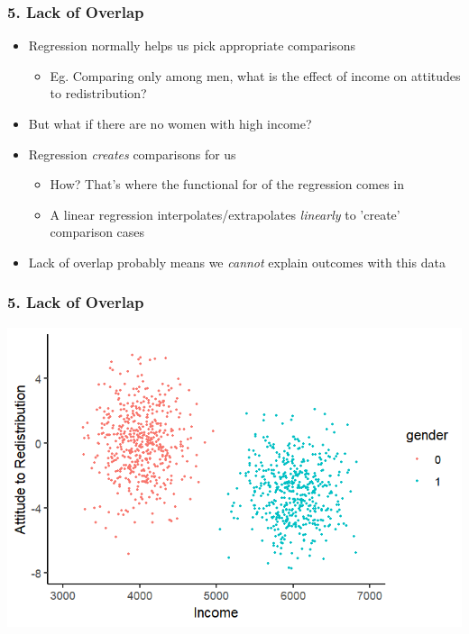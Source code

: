 \documentclass[xcolor=x11names,compress]{beamer}\usepackage[]{graphicx}\usepackage[]{color}
\makeatletter
\def\maxwidth{ %
  \ifdim\Gin@nat@width>\linewidth
    \linewidth
  \else
    \Gin@nat@width
  \fi
}
\newenvironment{knitrout}{}{} %
\renewcommand{\(}{\begin{columns}}
\renewcommand{\)}{\end{columns}}
\newcommand{\<}[1]{\begin{column}{#1}}
\renewcommand{\>}{\end{column}}
\makeatother
\begin{document}
\begin{frame}
\frametitle{5. Lack of Overlap}
\begin{itemize}
\item Regression normally helps us pick appropriate comparisons
\begin{itemize}
\item Eg. Comparing only among men, what is the effect of income on attitudes to redistribution? 
\end{itemize}
\item But what if there are no women with high income?
\item Regression \textit{creates} comparisons for us
\begin{itemize}
\item How? That's where the functional for of the regression comes in
\item A linear regression interpolates/extrapolates \textit{linearly} to 'create' comparison cases
\end{itemize}
\item Lack of overlap probably means we \textit{cannot} explain outcomes with this data
\end{itemize}
\end{frame}

\begin{frame}
\frametitle{5. Lack of Overlap}
\begin{knitrout}
\color{fgcolor}
\includegraphics[width=\maxwidth]{figure/overlap1-1} 

\end{knitrout}
\end{frame}
\end{document}
